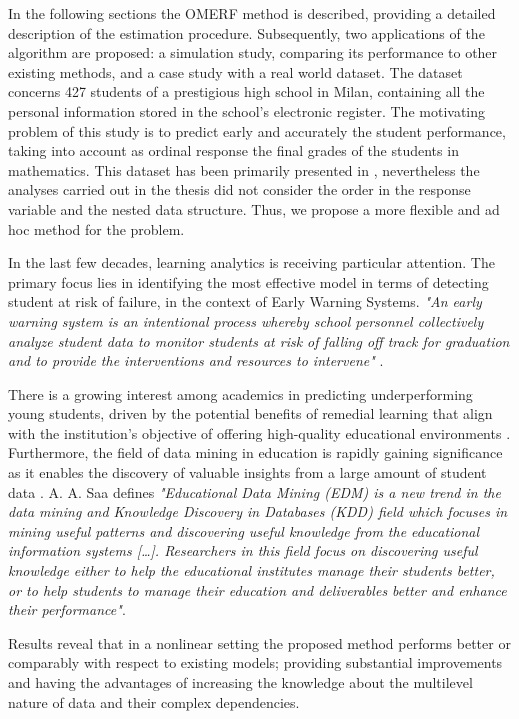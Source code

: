 In the following sections the OMERF method is described, providing a detailed description of the estimation procedure. Subsequently, two applications of the algorithm are proposed: a simulation study, comparing its performance to other existing methods, and a case study with a real world dataset.
The dataset concerns 427 students of a prestigious high school in Milan, containing  all the personal information stored in the school's electronic register.
The motivating problem of this study is to predict early and accurately the student performance, taking into account as ordinal response the final grades of the students in mathematics.
This dataset has been primarily presented in \cite{tesilidia}, nevertheless the analyses carried out in the thesis did not consider the order in the response variable and the nested data structure. Thus, we propose a more flexible and ad hoc method for the problem.

In the last few decades, learning analytics is receiving particular attention.
The primary focus lies in identifying the most effective model in terms of detecting student at risk of failure, in the context of Early Warning Systems.
\textit{"An early warning system is an intentional process whereby school personnel collectively analyze student data to monitor students at risk of falling off track for graduation and to provide the interventions and resources to intervene"} \cite{davis2013organizing}.

There is a growing interest among academics in predicting underperforming young students, driven by the potential benefits of remedial learning that align with the institution's objective of offering high-quality educational environments \cite{wilkins2016dropout}.
Furthermore, the field of data mining in education is rapidly gaining significance as it enables the discovery of valuable insights from a large amount of student data \cite{wibawa2021learning,paul2020exploring}.
A. A. Saa \cite{saa2016educational} defines \textit{"Educational Data Mining (EDM) is a new trend in the data mining and Knowledge Discovery in Databases (KDD) field
which focuses in mining useful patterns and discovering useful knowledge from the educational information systems [\dots]. Researchers in this field
focus on discovering useful knowledge either to help the educational institutes manage their students better, or to help students to manage their education and deliverables better and
enhance their performance"}.


Results reveal that in a nonlinear setting the proposed method performs better or comparably with respect to existing models; providing substantial improvements and having the advantages of increasing the knowledge about the multilevel nature of data and their complex dependencies.

